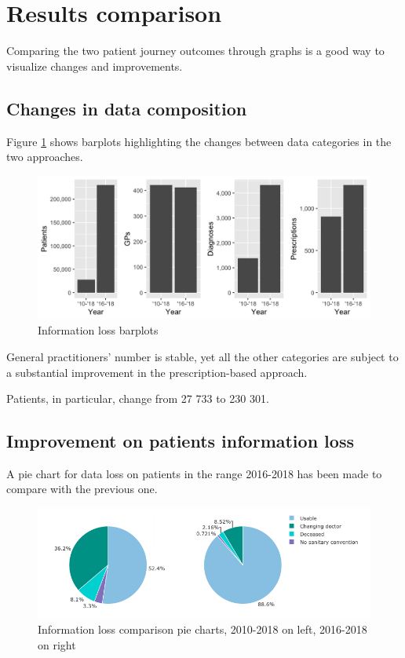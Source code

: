 \section{Results comparison}
Comparing the two patient journey outcomes through graphs is a good way to visualize changes and improvements.

\subsection{Changes in data composition}
Figure \ref{barplots} shows barplots highlighting the changes between data categories in the two approaches.
\begin{figure}[h]
	\centering
	\includegraphics[scale=0.33]{../plots/pj-barplots.png}
	\caption{\small Information loss barplots}
	\label{barplots}
\end{figure}

General practitioners' number is stable, yet all the other categories are subject to a substantial improvement in the prescription-based approach.

Patients, in particular, change from 27 733 to 230 301.

\subsection{Improvement on patients information loss}
A pie chart for data loss on patients in the range 2016-2018 has been made to compare with the previous one.

\begin{figure}[h]
	\centering
	\includegraphics[scale=0.6]{images/patients-pies.png}
	\caption{\small Information loss comparison pie charts, 2010-2018 on left, 2016-2018 on right}
\end{figure}

